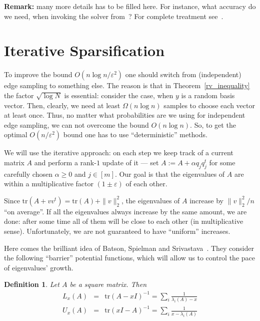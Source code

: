 \documentclass[12pt]{article}
\newcommand{\eps}{\varepsilon}
\newtheorem{definition}{Definition}
\begin{document}
    \textbf{Remark:} many more details has to be filled here. For instance, what accuracy
    do we need, when invoking the solver from~\cite{KMP10}? For complete treatment
    see~\cite{SS11}.

    \section{Iterative Sparsification}
    \label{iterative}

    To improve the bound $O(n \log n / \eps^2)$ one should switch from (independent) edge sampling to something else.
    The reason is that in Theorem~\ref{rv_inequality} the factor $\sqrt{\log N}$ is essential: consider the case,
    when $y$ is a random basis vector. Then, clearly, we need at least $\Omega(n \log n)$ samples to choose each
    vector at least once. Thus, no matter what probabilities are we using for independent edge sampling, we can not
    overcome the bound $O(n \log n)$.
    So, to get the optimal $O(n / \eps^2)$ bound one has to use ``deterministic'' methods.

    We will use the iterative approach: on each step we keep track of a current matrix $A$
    and perform a rank-$1$ update of it --- set $A := A + \alpha q_j q_j^t$ for some carefully chosen $\alpha \geq 0$ and
    $j \in [m]$. Our goal is that the eigenvalues of $A$ are within a multiplicative
    factor $(1 \pm \eps)$ of each other.

    Since $\mathrm{tr}(A + vv^t) = \mathrm{tr}(A) + \|v\|_2^2$, the eigenvalues of $A$ increase by
    $\|v\|_2^2 / n$ ``on average''. If all the eigenvalues always increase by the same amount, we are done: after some time
    all of them will be close to each other (in multiplicative sense).
    Unfortunately, we are not guaranteed to have ``uniform'' increases.

    Here comes the brilliant idea of Batson, Spielman and Srivastava~\cite{BSS09}.
    They consider the following ``barrier'' potential functions, which will allow us to control the pace of eigenvalues'
    growth.

    \begin{definition}
        Let $A$ be a square matrix. Then
        \begin{eqnarray*}
            L_x(A) &=& \mathrm{tr}(A - xI)^{-1} = \sum_i \frac{1}{\lambda_i(A) - x}\\
            U_x(A) &=& \mathrm{tr}(xI - A)^{-1} = \sum_i \frac{1}{x - \lambda_i(A)}\\
        \end{eqnarray*}
    \end{definition}
\end{document}
